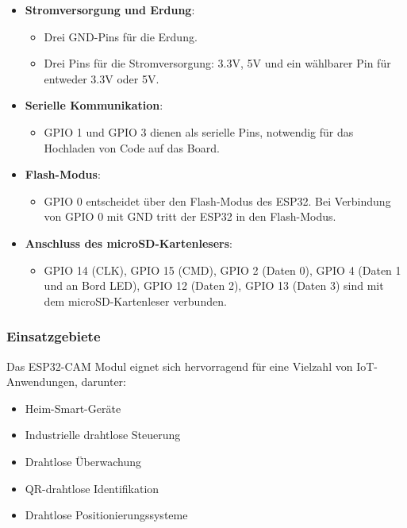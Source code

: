 \documentclass{vorlage-design-main}
\begin{document}
\begin{itemize}

\item
  \textbf{Stromversorgung und Erdung}:

  \begin{itemize}
  
  \item
    Drei GND-Pins für die Erdung.
  \item
    Drei Pins für die Stromversorgung: 3.3V, 5V und ein wählbarer Pin
    für entweder 3.3V oder 5V.
  \end{itemize}
\item
  \textbf{Serielle Kommunikation}:

  \begin{itemize}
  
  \item
    GPIO 1 und GPIO 3 dienen als serielle Pins, notwendig für das
    Hochladen von Code auf das Board.
  \end{itemize}
\item
  \textbf{Flash-Modus}:

  \begin{itemize}
  
  \item
    GPIO 0 entscheidet über den Flash-Modus des ESP32. Bei Verbindung
    von GPIO 0 mit GND tritt der ESP32 in den Flash-Modus.
  \end{itemize}
\item
  \textbf{Anschluss des microSD-Kartenlesers}:

  \begin{itemize}
  
  \item
    GPIO 14 (CLK), GPIO 15 (CMD), GPIO 2 (Daten 0), GPIO 4 (Daten 1 und
    an Bord LED), GPIO 12 (Daten 2), GPIO 13 (Daten 3) sind mit dem
    microSD-Kartenleser verbunden.
  \end{itemize}
\end{itemize}

\hypertarget{einsatzgebiete}{%
\subsubsection{Einsatzgebiete}\label{einsatzgebiete}}

Das ESP32-CAM Modul eignet sich hervorragend für eine Vielzahl von
IoT-Anwendungen, darunter:

\begin{itemize}

\item
  Heim-Smart-Geräte
\item
  Industrielle drahtlose Steuerung
\item
  Drahtlose Überwachung
\item
  QR-drahtlose Identifikation
\item
  Drahtlose Positionierungssysteme
\end{itemize}
\end{document}
